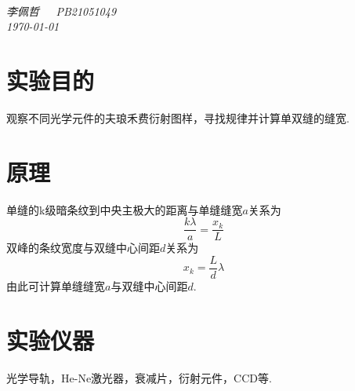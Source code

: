 \documentclass[a4paper]{article}%
\title{\heiti{实验报告}}%
\author{{\emph{李佩哲}}}
\date{\emph{\small\today}}
\begin{document}
\begin{center}
\\
\emph{李佩哲~~~PB21051049~~~\\\today}
\end{center}

\section{实验目的}
观察不同光学元件的夫琅禾费衍射图样，寻找规律并计算单双缝的缝宽.

\section{原理}
单缝的k级暗条纹到中央主极大的距离与单缝缝宽$a$关系为$$\frac{k\lambda}{a}=\frac{x_k}{L}$$
双峰的条纹宽度与双缝中心间距$d$关系为$$x_k=\frac{L}{d}\lambda$$
由此可计算单缝缝宽$a$与双缝中心间距$d$.

\section{实验仪器}
光学导轨，He-Ne激光器，衰减片，衍射元件，CCD等.
\end{document}
